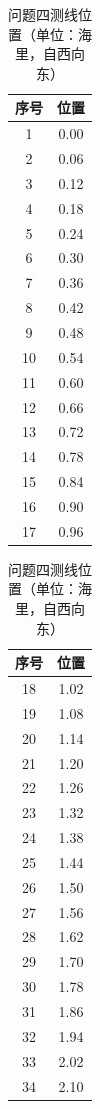 \documentclass[12pt]{ctexart}
\begin{document}
\begin{table}[H]\centering
\caption{问题四测线位置（单位：海里，自西向东）}
\label{tab:p4pos}
\small
\begin{minipage}[t]{0.32\textwidth}\centering
\begin{tabular}{cc}
\toprule
序号 & 位置 \\
\midrule
1 & 0.00 \\ 2 & 0.06 \\ 3 & 0.12 \\ 4 & 0.18 \\ 5 & 0.24 \\
6 & 0.30 \\ 7 & 0.36 \\ 8 & 0.42 \\ 9 & 0.48 \\ 10 & 0.54 \\
11 & 0.60 \\ 12 & 0.66 \\ 13 & 0.72 \\ 14 & 0.78 \\ 15 & 0.84 \\
16 & 0.90 \\ 17 & 0.96 \\
\bottomrule
\end{tabular}
\end{minipage}\hfill
\begin{minipage}[t]{0.32\textwidth}\centering
\begin{tabular}{cc}
\toprule
序号 & 位置 \\
\midrule
18 & 1.02 \\ 19 & 1.08 \\ 20 & 1.14 \\ 21 & 1.20 \\ 22 & 1.26 \\
23 & 1.32 \\ 24 & 1.38 \\ 25 & 1.44 \\ 26 & 1.50 \\ 27 & 1.56 \\
28 & 1.62 \\ 29 & 1.70 \\ 30 & 1.78 \\ 31 & 1.86 \\ 32 & 1.94 \\
33 & 2.02 \\ 34 & 2.10 \\
\bottomrule
\end{tabular}
\end{minipage}\hfill

\end{table}
\end{document}
